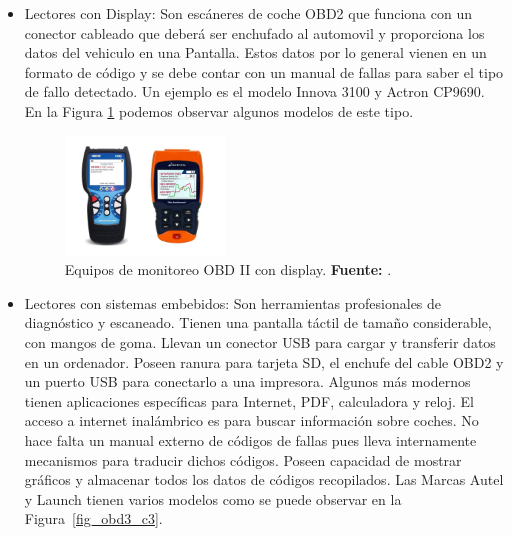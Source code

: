\begin{itemize}
	
	
	
	\item Lectores con Display: Son escáneres de coche OBD2 que funciona con un conector cableado que deberá ser enchufado al automovil y proporciona los datos del vehiculo en una Pantalla. Estos datos por lo general vienen en un formato de código y se debe contar con un manual de fallas para saber el tipo de fallo detectado. Un ejemplo es el modelo Innova 3100 y  Actron CP9690. En la Figura \ref{fig_obd2_c3} podemos observar algunos modelos de este tipo. 
	
	
	
	\begin{figure}[H]
		\centering
		\includegraphics[width=0.4\textwidth]{./Cap3imagen/Innova.JPG}
		\caption[Equipos de monitoreo OBD II con display.]{Equipos de monitoreo OBD II con display.\textbf{ Fuente:} \cite{cite_obd0_c3}.}
		\label{fig_obd2_c3} %
	\end{figure}
	
	
	\item Lectores con sistemas embebidos: Son  herramientas profesionales de diagnóstico y escaneado. Tienen una pantalla táctil de tamaño considerable, con mangos de goma. Llevan un conector USB para cargar y transferir datos en un ordenador. Poseen ranura para tarjeta SD, el enchufe del cable OBD2 y un puerto USB para conectarlo a una impresora. Algunos más modernos  tienen aplicaciones específicas para Internet, PDF, calculadora y reloj. El acceso a internet inalámbrico es para buscar información sobre coches. No hace falta un manual externo de códigos de fallas pues lleva internamente mecanismos para traducir dichos códigos.  Poseen capacidad de mostrar gráficos  y almacenar todos los datos de códigos recopilados. Las Marcas Autel y Launch tienen varios modelos como se puede observar en la Figura~\ref{fig_obd3_c3}. 
	

\end{itemize}
